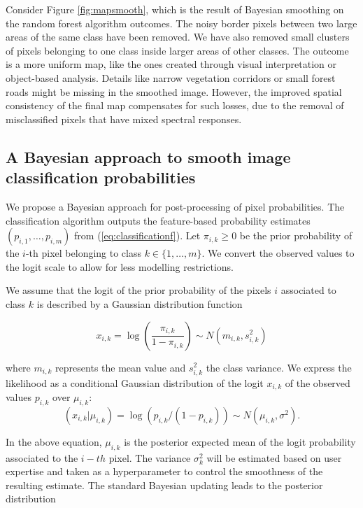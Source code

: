 \documentclass[
  shortnames]{jss}
\begin{document}
Consider Figure \ref{fig:mapsmooth}, which is the result of Bayesian smoothing on the random forest algorithm outcomes. The noisy border pixels between two large areas of the same class have been removed. We have also removed small clusters of pixels belonging to one class inside larger areas of other classes. The outcome is a more uniform map, like the ones created through visual interpretation or object-based analysis. Details like narrow vegetation corridors or small forest roads might be missing in the smoothed image. However, the improved spatial consistency of the final map compensates for such losses, due to the removal of misclassified pixels that have mixed spectral responses.

\subsection{A Bayesian approach to smooth image classification probabilities}\label{a-bayesian-approach-to-smooth-image-classification-probabilities}

We propose a Bayesian approach for post-processing of pixel probabilities. The classification algorithm outputs the feature-based probability estimates \((p_{i,1}, \ldots, p_{i,m})\) from (\ref{eq:classificationf}). Let \(\pi_{i,k} \geq 0\) be the prior probability of the \(i\)-th pixel belonging to class \(k \in \{1, \ldots, m\}\). We convert the observed values to the logit scale to allow for less modelling restrictions.

We assume that the logit of the prior probability of the pixels \(i\) associated to class \(k\) is described by a Gaussian distribution function

\begin{equation} 
x_{i,k} = \log\left( \frac{\pi_{i,k}}{1-\pi_{i,k}} \right) \sim N(m_{i,k}, s^2_{i,k}) 
\end{equation}

where \(m_{i,k}\) represents the mean value and \(s^2_{i,k}\) the class variance. We express the likelihood as a conditional Gaussian distribution of the logit \(x_{i,k}\) of the observed values \(p_{i,k}\) over \(\mu_{i,k}\):
\begin{equation}
(x_{i,k} | \mu_{i,k}) = \log(p_{i,k}/(1-p_{i,k})) \sim N(\mu_{i,k}, \sigma^2). 
\end{equation}

In the above equation, \(\mu_{i,k}\) is the posterior expected mean of the logit probability associated to the \(i-th\) pixel. The variance \(\sigma^2_{k}\) will be estimated based on user expertise and taken as a hyperparameter to control the smoothness of the resulting estimate. The standard Bayesian updating \citep{Gelman2014} leads to the posterior distribution
\end{document}
